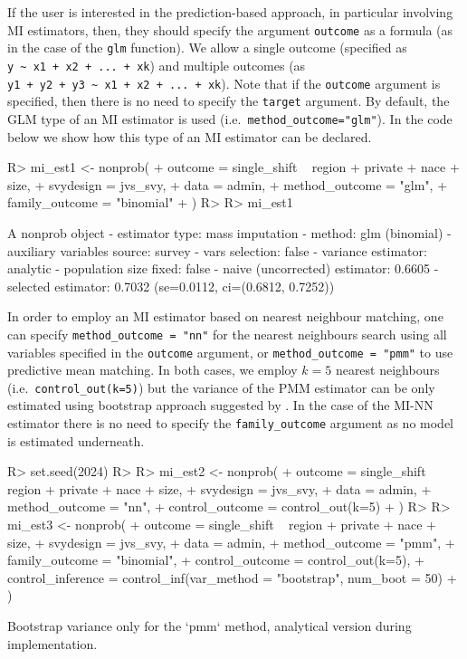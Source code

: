 \documentclass[
]{jss}
\begin{document}
If the user is interested in the prediction-based approach, in
particular involving MI estimators, then, they should specify the
argument \texttt{outcome} as a formula (as in the case of the
\texttt{glm} function). We allow a single outcome (specified as
\texttt{y\ \textasciitilde{}\ x1\ +\ x2\ +\ ...\ +\ xk}) and multiple
outcomes (as
\texttt{y1\ +\ y2\ +\ y3\ \textasciitilde{}\ x1\ +\ x2\ +\ ...\ +\ xk}).
Note that if the \texttt{outcome} argument is specified, then there is
no need to specify the \texttt{target} argument. By default, the GLM
type of an MI estimator is used (i.e.~\texttt{method\_outcome="glm"}).
In the code below we show how this type of an MI estimator can be
declared.

\begin{CodeChunk}
\begin{CodeInput}
R> mi_est1 <- nonprob(
+   outcome = single_shift ~ region + private + nace + size,
+   svydesign = jvs_svy,
+   data = admin,
+   method_outcome = "glm",
+   family_outcome = "binomial"
+ )
R> 
R> mi_est1
\end{CodeInput}
\begin{CodeOutput}
A nonprob object
 - estimator type: mass imputation
 - method: glm (binomial)
 - auxiliary variables source: survey
 - vars selection: false
 - variance estimator: analytic
 - population size fixed: false
 - naive (uncorrected) estimator: 0.6605
 - selected estimator: 0.7032 (se=0.0112, ci=(0.6812, 0.7252))
\end{CodeOutput}
\end{CodeChunk}

In order to employ an MI estimator based on nearest neighbour matching,
one can specify \texttt{method\_outcome\ =\ "nn"} for the nearest
neighbours search using all variables specified in the \texttt{outcome}
argument, or \texttt{method\_outcome\ =\ "pmm"} to use predictive mean
matching. In both cases, we employ \(k=5\) nearest neighbours
(i.e.~\texttt{control\_out(k=5)}) but the variance of the PMM estimator
can be only estimated using bootstrap approach suggested by
\citet{chlebicki2025}. In the case of the MI-NN estimator there is no
need to specify the \texttt{family\_outcome} argument as no model is
estimated underneath.

\begin{CodeChunk}
\begin{CodeInput}
R> set.seed(2024)
R> 
R> mi_est2 <- nonprob(
+   outcome = single_shift ~ region + private + nace + size,
+   svydesign = jvs_svy,
+   data = admin,
+   method_outcome = "nn",
+   control_outcome = control_out(k=5)
+ )
R> 
R> mi_est3 <- nonprob(
+   outcome = single_shift ~ region + private + nace + size,
+   svydesign = jvs_svy,
+   data = admin,
+   method_outcome = "pmm",
+   family_outcome = "binomial", 
+   control_outcome = control_out(k=5),
+   control_inference = control_inf(var_method = "bootstrap", num_boot = 50)
+ )
\end{CodeInput}
\begin{CodeOutput}
Bootstrap variance only for the `pmm` method, analytical version during implementation.
\end{CodeOutput}
\end{CodeChunk}
\end{document}
